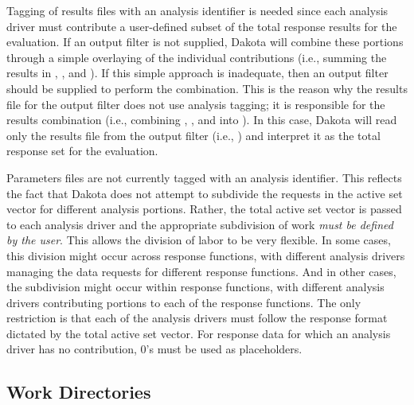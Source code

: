 Tagging of results files with an analysis identifier is needed
since each analysis driver must contribute a
user-defined subset of the total response results for the evaluation.
If an output filter is not supplied, Dakota will combine these
portions through a simple overlaying of the individual contributions
(i.e., summing the results in ,
, and ). If
this simple approach is inadequate, then an output filter should be
supplied to perform the combination. This is the reason why the
results file for the output filter does not use analysis tagging; it
is responsible for the results combination (i.e., combining
, , and
 into ). In
this case, Dakota will read only the results file from the output
filter (i.e., ) and interpret it as the
total response set for the evaluation.

Parameters files are not currently tagged with an analysis identifier.
This reflects the fact that Dakota does not attempt to subdivide the
requests in the active set vector for different analysis portions.
Rather, the total active set vector is passed to each analysis driver
and the appropriate subdivision of work \emph{must be defined by the
  user}. This allows the division of labor to be very flexible. In
some cases, this division might occur across response functions, with
different analysis drivers managing the data requests for different
response functions. And in other cases, the subdivision might occur
within response functions, with different analysis drivers
contributing portions to each of the response functions. The only
restriction is that each of the analysis drivers must follow the
response format dictated by the total active set vector. For response
data for which an analysis driver has no contribution, 0's must be
used as placeholders.

\subsection{Work Directories}\label{interfaces:workdir}

